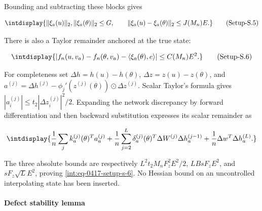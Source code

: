 
Bounding and subtracting these blocks gives


\label{int:eq-setup-s-5}
\begingroup\renewcommand{\theHequation}{intdisplay.855}
\begin{equation}
\intdisplay{
\|\xi_a(u)\|_2,\|\xi_a(\theta)\|_2\le G,\qquad
\|\xi_a(u)-\xi_a(\theta)\|_2\le J(M_n)E.
}
\tag{Setup-S.5}
\label{int:eq-0416-setup-s-5}
\end{equation}
\endgroup


There is also a Taylor remainder anchored at the true state:


\label{int:eq-setup-s-6}
\begingroup\renewcommand{\theHequation}{intdisplay.856}
\begin{equation}
\intdisplay{
|f_n(u,v_a)-f_n(\theta,v_a)-\langle\xi_a(\theta),e\rangle|
\le C(M_n)E^2.
}
\tag{Setup-S.6}
\label{int:eq-0417-setup-s-6}
\end{equation}
\endgroup


For completeness set \(\Delta h=h(u)-h(\theta)\), \(\Delta z=z(u)-z(\theta)\), and \(a^{(j)}=\Delta h^{(j)}-\phi_j'(z^{(j)}(\theta))\odot\Delta z^{(j)}\). Scalar Taylor's formula gives \(|a_i^{(j)}|\le t_2|\Delta z_i^{(j)}|^2/2\). Expanding the network discrepancy by forward differentiation and then backward substitution expresses its scalar remainder as


\begingroup\renewcommand{\theHequation}{intdisplay.857}
\begin{equation*}
\intdisplay{
\frac1n\sum_j k_a^{(j)}(\theta)^Ta_a^{(j)}
+\frac1n\sum_{j=2}^L\delta_a^{(j)}(\theta)^T
             \Delta W^{(j)}\Delta h_a^{(j-1)}
+\frac1n\Delta w^T\Delta h_a^{(L)}.
}
\end{equation*}
\endgroup


The three absolute bounds are respectively \(L^2t_2M_nF_z^2E^2/2\), \(LBsF_zE^2\), and \(sF_z\sqrt L E^2\), proving \hyperref[int:eq-setup-s-6]{\eqref{int:eq-0417-setup-s-6}}. No Hessian bound on an uncontrolled interpolating state has been inserted.


\paragraph{Defect stability lemma}
\label{int:setup-stability-3}
\mbox{}\par\smallskip

